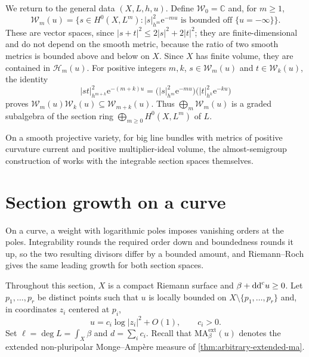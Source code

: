 We return to the general data $(X,L,h,u)$. Define $\mathcal W_0=\mathbb C$ and, for $m\geq1$,
\[
 \mathcal W_m(u)=\{s\in H^0(X,L^m):
             |s|_{h^m}^2\mathrm{e}^{-mu}\text{ is bounded off }\{u=-\infty\}\}.
\]
These are vector spaces, since $|s+t|^2\leq2|s|^2+2|t|^2$; they are finite-dimensional and do not depend on the smooth metric, because the ratio of two smooth metrics is bounded above and below on $X$. Since $X$ has finite volume, they are contained in $\mathcal H_m(u)$. For positive integers $m,k$, $s\in\mathcal W_m(u)$ and $t\in\mathcal W_k(u)$, the identity
\[
 |st|_{h^{m+k}}^2\mathrm{e}^{-(m+k)u}
 =\bigl(|s|_{h^m}^2\mathrm{e}^{-mu}\bigr)
  \bigl(|t|_{h^k}^2\mathrm{e}^{-ku}\bigr)
\]
proves $\mathcal W_m(u)\mathcal W_k(u)\subseteq\mathcal W_{m+k}(u)$. Thus $\bigoplus_m\mathcal W_m(u)$ is a graded subalgebra of the section ring $\bigoplus_{m\geq0}H^0(X,L^m)$ of $L$.

On a smooth projective variety, for big line bundles with metrics of positive curvature current and positive multiplier-ideal volume, the almost-semigroup construction of \cite[Section~10.3]{SGPT} works with the integrable section spaces themselves.

\section{Section growth on a curve}

On a curve, a weight with logarithmic poles imposes vanishing orders at the poles. Integrability rounds the required order down and boundedness rounds it up, so the two resulting divisors differ by a bounded amount, and Riemann--Roch gives the same leading growth for both section spaces.

Throughout this section, $X$ is a compact Riemann surface and $\beta+\mathrm{dd}^{\mathrm{c}} u\geq0$. Let $p_1,\ldots,p_r$ be distinct points such that $u$ is locally bounded on $X\setminus\{p_1,\ldots,p_r\}$ and, in coordinates $z_i$ centered at $p_i$,
\[
 u=c_i\log|z_i|^2+O(1),\qquad c_i>0.
\]
Set $\ell=\deg L=\int_X\beta$ and $d=\sum_i c_i$. Recall that $\mathrm{MA}^{\mathrm{ext}}_\beta(u)$ denotes the extended non-pluripolar Monge--Amp\`ere measure of \cref{thm:arbitrary-extended-ma}.

